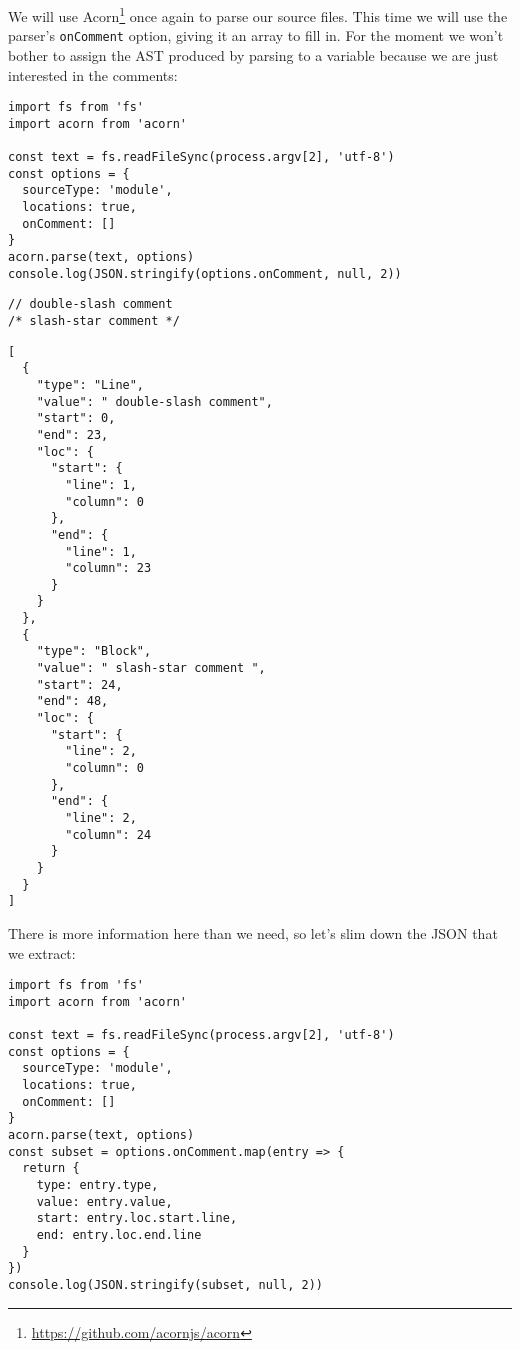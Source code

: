 \documentclass[krantzl]{krantz}
\newcommand{\hreffoot}[2]{{#1}\footnote{\href{#2}{#2}}}
\begin{document}
We will use \hreffoot{Acorn}{https://github.com/acornjs/acorn} once again to parse our source files.
This time we will use the parser’s \texttt{onComment} option,
giving it an array to fill in.
For the moment we won’t bother to assign the AST produced by parsing to a variable
because we are just interested in the comments:


\begin{lstlisting}[frame=tblr]
import fs from 'fs'
import acorn from 'acorn'

const text = fs.readFileSync(process.argv[2], 'utf-8')
const options = {
  sourceType: 'module',
  locations: true,
  onComment: []
}
acorn.parse(text, options)
console.log(JSON.stringify(options.onComment, null, 2))
\end{lstlisting}



\begin{lstlisting}[frame=tblr]
// double-slash comment
/* slash-star comment */
\end{lstlisting}



\begin{lstlisting}[frame=tblr,backgroundcolor=\color{black!5}]
[
  {
    "type": "Line",
    "value": " double-slash comment",
    "start": 0,
    "end": 23,
    "loc": {
      "start": {
        "line": 1,
        "column": 0
      },
      "end": {
        "line": 1,
        "column": 23
      }
    }
  },
  {
    "type": "Block",
    "value": " slash-star comment ",
    "start": 24,
    "end": 48,
    "loc": {
      "start": {
        "line": 2,
        "column": 0
      },
      "end": {
        "line": 2,
        "column": 24
      }
    }
  }
]
\end{lstlisting}



There is more information here than we need,
so let’s slim down the JSON that we extract:


\begin{lstlisting}[frame=tblr]
import fs from 'fs'
import acorn from 'acorn'

const text = fs.readFileSync(process.argv[2], 'utf-8')
const options = {
  sourceType: 'module',
  locations: true,
  onComment: []
}
acorn.parse(text, options)
const subset = options.onComment.map(entry => {
  return {
    type: entry.type,
    value: entry.value,
    start: entry.loc.start.line,
    end: entry.loc.end.line
  }
})
console.log(JSON.stringify(subset, null, 2))
\end{lstlisting}
\end{document}
